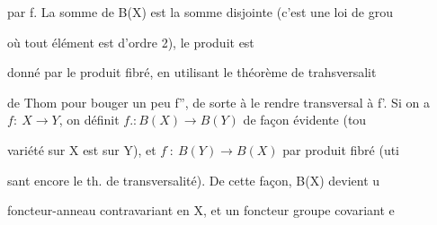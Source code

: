 par f. La somme de B(X) est la somme disjointe (c'est une loi de grou

 où tout élément est d'ordre  2), le produit est

donné par le produit fibré, en utilisant le théorème de trahsversalit

de Thom pour bouger un peu f'', de sorte à le rendre transversal à f'.
Si on a $f{:}\ X\to Y$, on définit $f. : B(X)\to B(Y)$ de façon évidente (tou

variété sur X est sur Y), et $f^{\cdot}{:}\ B(Y)\to B(X)$ par produit fibré (uti

sant encore le th. de transversalité). De cette façon, B(X) devient u

foncteur-anneau  contravariant en X, et un foncteur groupe covariant e

